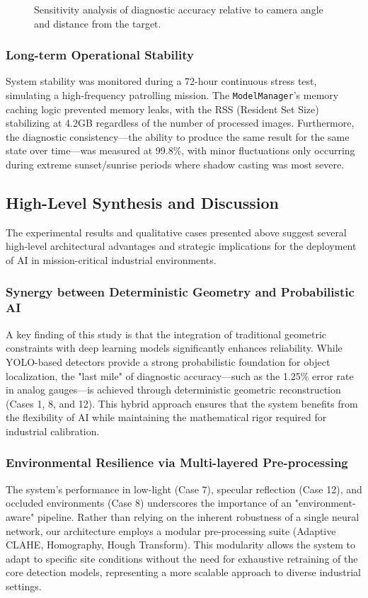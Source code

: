 \begin{figure}[h]
\centering
\fbox{\rule{0pt}{1.5in} \rule{0.8\linewidth}{0pt}} %
\caption{Sensitivity analysis of diagnostic accuracy relative to camera angle and distance from the target.}
\label{fig:sensitivity}
\end{figure}

\subsubsection{Long-term Operational Stability}
System stability was monitored during a 72-hour continuous stress test, simulating a high-frequency patrolling mission. The \texttt{ModelManager}'s memory caching logic prevented memory leaks, with the RSS (Resident Set Size) stabilizing at 4.2GB regardless of the number of processed images. Furthermore, the diagnostic consistency—the ability to produce the same result for the same state over time—was measured at 99.8\%, with minor fluctuations only occurring during extreme sunset/sunrise periods where shadow casting was most severe.

\subsection{High-Level Synthesis and Discussion}
The experimental results and qualitative cases presented above suggest several high-level architectural advantages and strategic implications for the deployment of AI in mission-critical industrial environments.

\subsubsection{Synergy between Deterministic Geometry and Probabilistic AI}
A key finding of this study is that the integration of traditional geometric constraints with deep learning models significantly enhances reliability. While YOLO-based detectors provide a strong probabilistic foundation for object localization, the "last mile" of diagnostic accuracy—such as the 1.25\% error rate in analog gauges—is achieved through deterministic geometric reconstruction (Cases 1, 8, and 12). This hybrid approach ensures that the system benefits from the flexibility of AI while maintaining the mathematical rigor required for industrial calibration.

\subsubsection{Environmental Resilience via Multi-layered Pre-processing}
The system's performance in low-light (Case 7), specular reflection (Case 12), and occluded environments (Case 8) underscores the importance of an "environment-aware" pipeline. Rather than relying on the inherent robustness of a single neural network, our architecture employs a modular pre-processing suite (Adaptive CLAHE, Homography, Hough Transform). This modularity allows the system to adapt to specific site conditions without the need for exhaustive retraining of the core detection models, representing a more scalable approach to diverse industrial settings.

